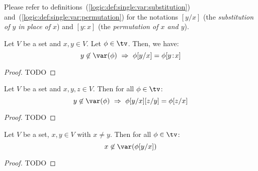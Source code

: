 Please refer to definitions~(\ref{logic:def:single:var:substitution})
and~(\ref{logic:def:single:var:permutation}) for the notations $[y/x]$ 
(the {\em substitution of $y$ in place of $x$}) and 
$[y\!:\!x]$ (the  {\em permutation of $x$ and $y$}).

\begin{prop}\label{logic:prop:LAM:permutation:is:substitution}
    Let $V$ be a set and $x,y\in V$. Let $\phi\in\tv$. Then, we have:
        \[
            y\not\in\var(\phi)\ \Rightarrow\ \phi[y/x]=\phi[y\!:\!x]
        \]
\end{prop}
\begin{proof}
TODO
\end{proof}

\begin{prop}\label{logic:prop:LAM:single:composition}
    Let $V$ be a set and $x,y,z\in V$. Then for all $\phi\in\tv$:
        \[
            y\not\in\var(\phi)\ \Rightarrow\ \phi[y/x][z/y]=\phi[z/x]
        \]
\end{prop}
\begin{proof}
TODO
\end{proof}

\begin{prop}\label{logic:prop:LAM:inplaceof:notvar}
    Let $V$ be a set, $x,y\in V$ with $x\neq y$. Then for all $\phi\in\tv$:
        \[
            x\not\in\var(\phi[y/x])
        \]
\end{prop}
\begin{proof}
TODO
\end{proof}

